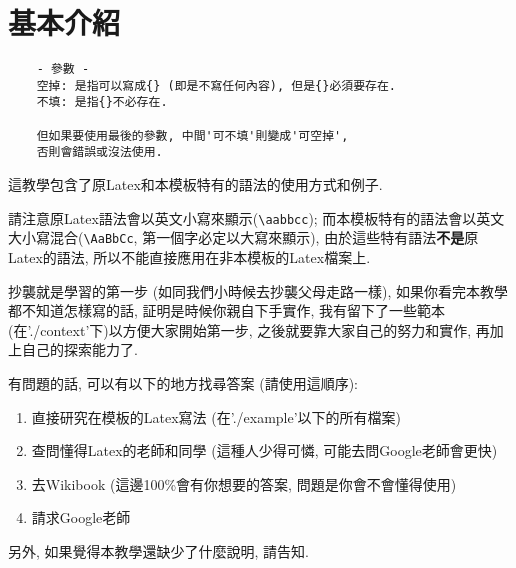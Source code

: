 \section{基本介紹}

  \begin{framed}
  \begin{verbatim}
    - 參數 -
    空掉: 是指可以寫成{} (即是不寫任何內容), 但是{}必須要存在.
    不填: 是指{}不必存在.

    但如果要使用最後的參數, 中間'可不填'則變成'可空掉',
    否則會錯誤或沒法使用.
  \end{verbatim}
  \end{framed}

這教學包含了原Latex和本模板特有的語法的使用方式和例子.

請注意原Latex語法會以英文小寫來顯示(\verb|\aabbcc|); 而本模板特有的語法會以英文大小寫混合(\verb|\AaBbCc|, 第一個字必定以大寫來顯示), 由於這些特有語法\textbf{不是}原Latex的語法, 所以不能直接應用在非本模板的Latex檔案上.

抄襲就是學習的第一步 (如同我們小時候去抄襲父母走路一樣), 如果你看完本教學都不知道怎樣寫的話, 証明是時候你親自下手實作, 我有留下了一些範本 (在'./context'下)以方便大家開始第一步, 之後就要靠大家自己的努力和實作, 再加上自己的探索能力了.

有問題的話, 可以有以下的地方找尋答案 (請使用這順序):
\begin{enumerate}
\item 直接研究在模板的Latex寫法 (在'./example'以下的所有檔案)
\item 查問懂得Latex的老師和同學 (這種人少得可憐, 可能去問Google老師會更快)
\item 去Wikibook (這邊100\%會有你想要的答案, 問題是你會不會懂得使用)
\item 請求Google老師
\end{enumerate}

另外, 如果覺得本教學還缺少了什麼說明, 請告知.

\EndChapter
